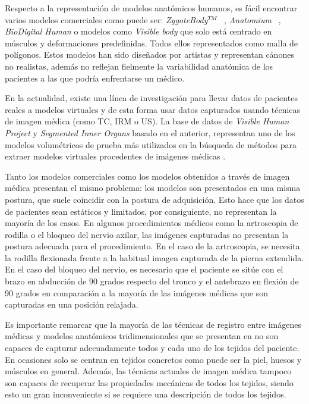Respecto a la representación de modelos anatómicos humanos, es fácil encontrar  varios modelos comerciales como puede ser: \emph{ZygoteBody}$^{TM}$ ~\cite{kelc2012zygote}, \emph{Anatomium} ~\cite{Anatomium},   \emph{BioDigital Human} \cite{qualter2012biodigital} o modelos como \emph{Visible body}\cite{visible2012visible} que solo está centrado en músculos y deformaciones predefinidas. Todos ellos representados como malla de polígonos. Estos modelos han sido  diseñados por artistas y representan cánones no realistas, además no reflejan fielmente la variabilidad anatómica de los pacientes a las que podría enfrentarse un médico. 

En la actualidad, existe una línea de investigación para llevar datos de pacientes reales a modelos virtuales y de esta forma usar datos capturados usando técnicas de imagen médica (como \ac{TC}, \ac{IRM} o \ac{US}). La base de datos de  \emph{Visible Human Project}\cite{ackerman1998visible} y  \emph{Segmented Inner Organs}\cite{VoxelMan} basado en el anterior, representan uno de los modelos volumétricos de prueba más utilizados en la búsqueda de métodos para extraer modelos virtuales procedentes de imágenes médicas \cite{ferrante2017slice}.

Tanto los modelos comerciales como los modelos obtenidos a través de imagen médica presentan el mismo problema: los modelos son presentados en una misma postura, que suele coincidir con la postura de adquisición. Esto hace que los datos de pacientes sean estáticos y limitados, por consiguiente, no representan la mayoría de los casos. En algunos procedimientos médicos como la artroscopia de rodilla o el bloqueo del nervio axilar, las imágenes capturadas no presentan la postura adecuada para el procedimiento. En el caso de la artroscopia, se necesita la rodilla flexionada frente a la habitual imagen capturada de la pierna extendida. En el caso del bloqueo del nervio, es necesario que el paciente se sitúe con el brazo en abducción de 90 grados respecto del tronco y el antebrazo en flexión de 90 grados en comparación a la mayoría de las imágenes médicas que son capturadas en una posición relajada. 

Es importante remarcar que la mayoría de las técnicas de registro entre imágenes médicas y modelos anatómicos tridimensionales que se presentan en \cite{ferrante2017slice} no son capaces de capturar adecuadamente todos y cada uno de los tejidos del paciente. En ocasiones solo se centran en tejidos concretos como puede ser la piel, huesos y músculos en general. Además, las técnicas actuales de imagen médica tampoco son capaces de recuperar las propiedades mecánicas de todos los tejidos, siendo esto un gran inconveniente si se requiere una descripción de todos los tejidos.

